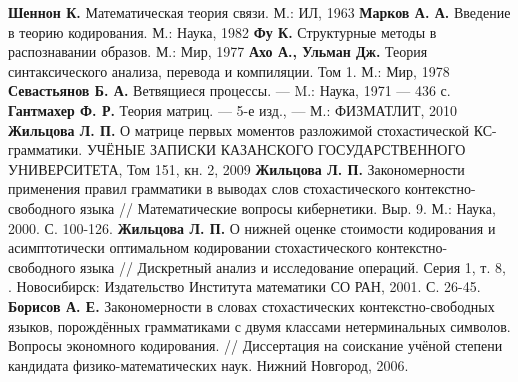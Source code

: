 \documentclass[12pt]{article}
\begin{document}
\begin{thebibliography}{99}
	\textbf{Шеннон К.} Математическая теория связи. М.: ИЛ, 1963
	\textbf{Марков А. А.} Введение в теорию кодирования. М.: Наука, 1982
	\textbf{Фу К.} Структурные методы в распознавании образов. М.: Мир, 1977
	\textbf{Ахо А., Ульман Дж.} Теория синтаксического анализа, перевода и компиляции. Том 1. М.: Мир, 1978
	\textbf{Севастьянов Б. А.} Ветвящиеся процессы. --- M.: Наука, 1971 --- 436 с.
	\textbf{Гантмахер Ф. Р.} Теория матриц. --- 5-е изд., --- М.: ФИЗМАТЛИТ, 2010
	\textbf{Жильцова Л. П.} О матрице первых моментов разложимой стохастической КС-грамматики. УЧЁНЫЕ ЗАПИСКИ КАЗАНСКОГО ГОСУДАРСТВЕННОГО УНИВЕРСИТЕТА, Том 151, кн. 2, 2009
	\textbf{Жильцова Л. П.} Закономерности применения правил грамматики в выводах слов стохастического контекстно-свободного языка // Математические вопросы кибернетики. Выр. 9. М.: Наука, 2000. С. 100-126.
	\textbf{Жильцова Л. П.} О нижней оценке стоимости кодирования и асимптотически оптимальном кодировании стохастического контекстно-свободного языка // Дискретный анализ и исследование операций. Серия 1, т. 8, . Новосибирск: Издательство Института математики СО РАН, 2001. С. 26-45.
	\textbf{Борисов А. Е.} Закономерности в словах стохастических контекстно-свободных языков, порождённых грамматиками с двумя классами нетерминальных символов. Вопросы экономного кодирования. // Диссертация на соискание учёной степени кандидата физико-математических наук. Нижний Новгород, 2006.
\end{thebibliography}
\end{document}
